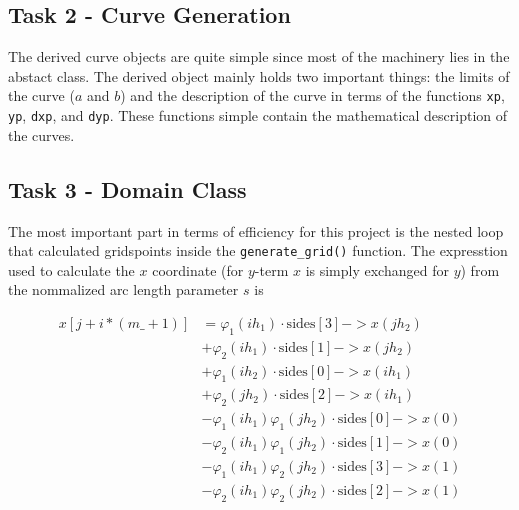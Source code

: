 \documentclass[paper=a4, fontsize=12pt]{article} %
\begin{document}
\subsection*{Task 2 - Curve Generation}

The derived curve objects are quite simple since most of the machinery lies in the abstact class. The derived object mainly holds two important things: the limits of the curve ($a$ and $b$) and the description of the curve in terms of the functions \texttt{xp}, \texttt{yp}, \texttt{dxp}, and \texttt{dyp}. These functions simple contain the mathematical description of the curves.

\subsection*{Task 3 - Domain Class}

The most important part in terms of efficiency for this project is the nested loop that calculated gridspoints inside the \texttt{generate\_grid()} function. The expresstion used to calculate the $x$ coordinate (for $y$-term $x$ is simply exchanged for $y$) from the nommalized arc length parameter $s$ is

\begin{align*}
x[j+i*(m\_+1)]  &= \varphi_1(ih_1)\cdot \textrm{sides}[3]->x(jh_2) \\
	&+ \varphi_2(ih_1)\cdot \textrm{sides}[1]->x(jh_2) \\
	&+ \varphi_1(ih_2)\cdot \textrm{sides}[0]->x(ih_1) \\
	&+ \varphi_2(jh_2)\cdot \textrm{sides}[2]->x(ih_1) \\
	&- \varphi_1(ih_1) \varphi_1(jh_2) \cdot  \textrm{sides}[0]->x(0) \\
	&- \varphi_2(ih_1) \varphi_1(jh_2) \cdot  \textrm{sides}[1]->x(0) \\
	&- \varphi_1(ih_1) \varphi_2(jh_2) \cdot  \textrm{sides}[3]->x(1) \\
	&- \varphi_2(ih_1) \varphi_2(jh_2) \cdot  \textrm{sides}[2]->x(1)
\end{align*}
\end{document}
